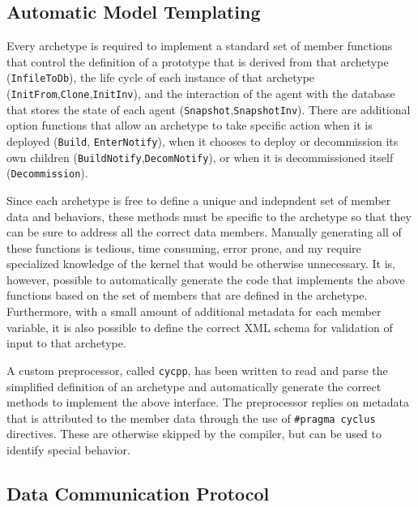 \subsection{Automatic Model Templating}
\label{subsec-ppgc}

Every \Cyclus archetype is required to implement a standard set of member
functions that control the definition of a prototype that is derived from that
archetype (\texttt{InfileToDb}), the life cycle of each instance of that
archetype (\texttt{InitFrom},\texttt{Clone},\texttt{InitInv}), and the
interaction of the agent with the database that stores the state of each agent
(\texttt{Snapshot},\texttt{SnapshotInv}).  There are additional option
functions that allow an archetype to take specific action when it is deployed
(\texttt{Build}, \texttt{EnterNotify}), when it chooses to deploy or
decommission its own children (\texttt{BuildNotify},\texttt{DecomNotify}), or
when it is decommissioned itself (\texttt{Decommission}).

Since each archetype is free to define a unique and indepndent set of member
data and behaviors, these methods must be specific to the archetype so that
they can be sure to address all the correct data members.  Manually generating
all of these functions is tedious, time consuming, error prone, and my require
specialized knowledge of the \Cyclus kernel that would be otherwise
unnecessary.  It is, however, possible to automatically generate the code
that implements the above functions based on the set of members that are
defined in the archetype.  Furthermore, with a small amount of additional
metadata for each member variable, it is also possible to define the correct
\gls{XML} schema for validation of input to that archetype.

A custom preprocessor, called \texttt{cycpp}, has been written to read and
parse the simplified definition of an archetype and automatically generate the
correct methods to implement the above interface.  The preprocessor replies on
metadata that is attributed to the member data through the use of
\texttt{\#pragma cyclus} directives.  These are otherwise skipped by the
compiler, but can be used to identify special behavior.

\subsection{Data Communication Protocol}


